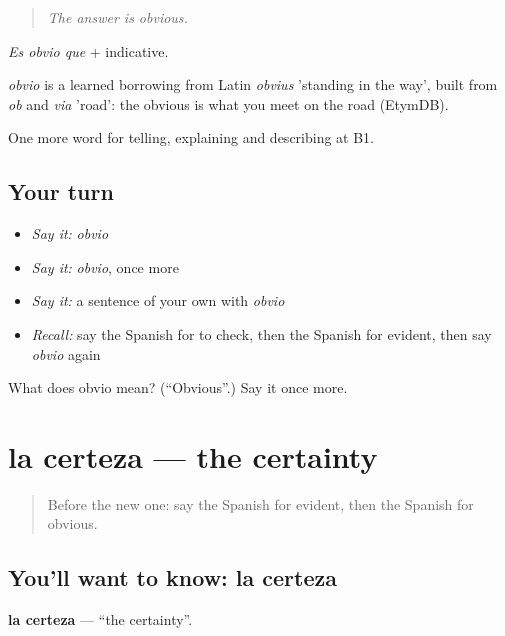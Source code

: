 \begin{quote}
\emph{The answer is obvious.}
\end{quote}

\emph{Es obvio que} + indicative.

\begin{cousinweb}
\emph{obvio} is a learned borrowing from Latin \emph{obvius} 'standing in the way', built from \emph{ob} and \emph{via} 'road': the obvious is what you meet on the road (EtymDB).
\end{cousinweb}

\begin{grammarlens}[title={What you've built}]
One more word for telling, explaining and describing at B1.
\end{grammarlens}

\subsection*{Your turn}
\begin{itemize}
\raggedright
  \item \emph{Say it:} \emph{obvio}
  \item \emph{Say it:} \emph{obvio}, once more
  \item \emph{Say it:} a sentence of your own with \emph{obvio}
  \item \emph{Recall:} say the Spanish for to check, then the Spanish for evident, then say \emph{obvio} again
\end{itemize}

\begin{tcolorbox}[breakable,colback=teal!4,colframe=teal!35!black,title={Before you move on}]
What does obvio mean? (\textquotedblleft{}Obvious\textquotedblright{}.) Say it once more.
\end{tcolorbox}
\section[la certeza]{la certeza — the certainty}

\label{lesson:ES-C587-certeza}



\begin{quote}
Before the new one: say the Spanish for evident, then the Spanish for obvious.
\end{quote}

\subsection*{You'll want to know: la certeza}
\textbf{la certeza} — \textquotedblleft{}the certainty\textquotedblright{}.

